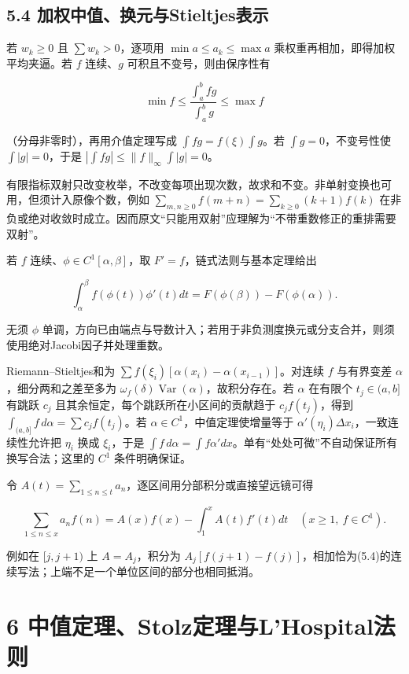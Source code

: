 \documentclass[11pt,a4paper]{article}
\begin{document}
\subsection{5.4
加权中值、换元与Stieltjes表示}\label{ux52a0ux6743ux4e2dux503cux6362ux5143ux4e0estieltjesux8868ux793a}

若 \(w_k\ge0\) 且 \(\sum w_k>0\)，逐项用 \(\min a\le a_k\le\max a\)
乘权重再相加，即得加权平均夹逼。若 \(f\) 连续、\(g\)
可积且不变号，则由保序性有

\[
\min f\le\frac{\int_a^bfg}{\int_a^bg}\le\max f
\]

（分母非零时），再用介值定理写成 \(\int fg=f(\xi)\int g\)。若
\(\int g=0\)，不变号性使 \(\int|g|=0\)，于是
\(|\int fg|\le\|f\|_\infty\int|g|=0\)。

有限指标双射只改变枚举，不改变每项出现次数，故求和不变。非单射变换也可用，但须计入原像个数，例如
\(\sum_{m,n\ge0}f(m+n)=\sum_{k\ge0}(k+1)f(k)\)
在非负或绝对收敛时成立。因而原文``只能用双射''应理解为``不带重数修正的重排需要双射''。

若 \(f\) 连续、\(\phi\in C^1[\alpha,\beta]\)，取
\(F'=f\)，链式法则与基本定理给出

\[
\int_\alpha^\beta f(\phi(t))\phi'(t)dt
=F(\phi(\beta))-F(\phi(\alpha)).\tag{5.6}
\]

无须 \(\phi\)
单调，方向已由端点与导数计入；若用于非负测度换元或分支合并，则须使用绝对Jacobi因子并处理重数。

Riemann--Stieltjes和为
\(\sum f(\xi_i)[\alpha(x_i)-\alpha(x_{i-1})]\)。对连续 \(f\) 与有界变差
\(\alpha\)，细分两和之差至多为
\(\omega_f(\delta)\operatorname{Var}(\alpha)\)，故积分存在。若
\(\alpha\) 在有限个 \(t_j\in(a,b]\) 有跳跃 \(c_j\)
且其余恒定，每个跳跃所在小区间的贡献趋于 \(c_jf(t_j)\)，得到
\(\int_{(a,b]}f\,d\alpha=\sum c_jf(t_j)\)。若
\(\alpha\in C^1\)，中值定理使增量等于
\(\alpha'(\eta_i)\Delta x_i\)，一致连续性允许把 \(\eta_i\) 换成
\(\xi_i\)，于是
\(\int f\,d\alpha=\int f\alpha' dx\)。单有``处处可微''不自动保证所有换写合法；这里的
\(C^1\) 条件明确保证。

令 \(A(t)=\sum_{1\le n\le t}a_n\)，逐区间用分部积分或直接望远镜可得

\[
\sum_{1\le n\le x}a_nf(n)
=A(x)f(x)-\int_1^xA(t)f'(t)dt\quad(x\ge1,\ f\in C^1).\tag{5.7}
\]

例如在 \([j,j+1)\) 上 \(A=A_j\)，积分为
\(A_j[f(j+1)-f(j)]\)，相加恰为(5.4)的连续写法；上端不足一个单位区间的部分也相同抵消。

\clearpage

\section{6
中值定理、Stolz定理与L'Hospital法则}\label{ux4e2dux503cux5b9aux7406stolzux5b9aux7406ux4e0elhospitalux6cd5ux5219}
\end{document}
